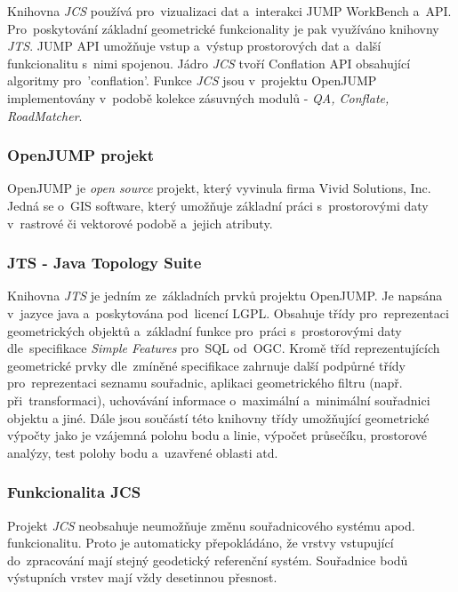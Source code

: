Knihovna \textit{JCS} používá pro~vizualizaci dat a~interakci JUMP WorkBench a~API. Pro~poskytování základní geometrické funkcionality je pak využíváno knihovny \textit{JTS}. 
JUMP API umožňuje vstup a~výstup prostorových dat a~další funkcionalitu s~nimi spojenou. Jádro \textit{JCS} tvoří Conflation API obsahující algoritmy pro~'conflation'. 
Funkce \textit{JCS} jsou v~projektu OpenJUMP implementovány v~podobě kolekce zásuvných modulů - \textit{QA, Conflate, RoadMatcher}.

\subsubsection{OpenJUMP projekt}

OpenJUMP je \textit{open source} projekt, který vyvinula firma Vivid Solutions, Inc. Jedná se o~GIS software, který umožňuje základní práci 
s~prostorovými daty v~rastrové či vektorové podobě a~jejich atributy.

\subsubsection{JTS - Java Topology Suite}

Knihovna \textit{JTS} je jedním ze~základních prvků projektu OpenJUMP. Je napsána v~jazyce java a~poskytována pod~licencí LGPL. Obsahuje třídy pro~reprezentaci geometrických
objektů a~základní funkce pro~práci s~prostorovými daty dle~specifikace \textit{Simple Features} pro~SQL od~OGC. Kromě tříd reprezentujících geometrické prvky dle~zmíněné
specifikace zahrnuje další podpůrné třídy pro~reprezentaci seznamu souřadnic, aplikaci geometrického filtru (např. při~transformaci), uchovávání informace o~maximální 
a~minimální souřadnici objektu a jiné. Dále jsou součástí této knihovny třídy umožňující geometrické výpočty jako je vzájemná polohu bodu a linie, výpočet průsečíku, 
prostorové analýzy, test polohy bodu a~uzavřené oblasti atd. 

\subsubsection{Funkcionalita JCS} %

Projekt \textit{JCS} neobsahuje neumožňuje změnu souřadnicového systému apod. funkcionalitu. Proto je automaticky přepokládáno, že vrstvy vstupující do~zpracování mají stejný
geodetický referenční systém. Souřadnice bodů výstupních vrstev mají vždy desetinnou přesnost.  %

